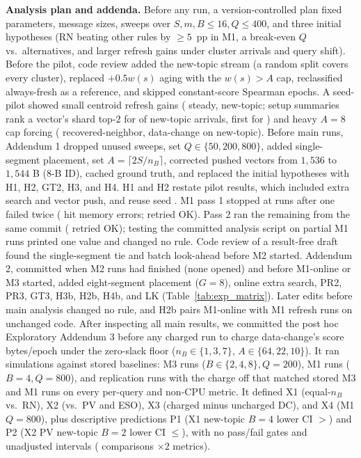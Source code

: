 \textbf{Analysis plan and addenda.} Before any run, a version-controlled plan fixed parameters, message sizes, sweeps over $S, m, B \le 16, Q \le 400$, and three initial hypotheses (RN beating other rules by $\ge 5$~pp in M1, a break-even $Q$ vs.\ alternatives, and larger refresh gains under cluster arrivals and query shift). Before the pilot, code review added the new-topic stream (a random split covers every cluster), replaced $+0.5 w(s)$ aging with the $w(s) > A$ cap, reclassified always-fresh as a reference, and skipped constant-score Spearman epochs. A seed-\RNumPilotSeed{} pilot showed small centroid refresh gains (\RNumPilotGateSteady{} steady, \RNumPilotGateNewTopic{} new-topic; setup summaries rank a vector's shard top-$2$ for \RNumPilotOwnShardTopTwo{} of new-topic arrivals, first for \RNumPilotOwnShardTopOne{}) and heavy $A = 8$ cap forcing (\RNumPilotCapShareRN{} recovered-neighbor, \RNumPilotCapShareDC{} data-change on new-topic). Before main runs, Addendum 1 dropped unused sweeps, set $Q \in \{50, 200, 800\}$, added single-segment placement, set $A = \lceil 2S / n_B \rceil$, corrected pushed vectors from $1{,}536$ to $1{,}544$ B ($8$-B ID), cached ground truth, and replaced the initial hypotheses with H1, H2, GT2, H3, and H4. H1 and H2 restate pilot results, which included extra search and vector push, and reuse seed \RNumPilotSeed{}. M1 pass 1 stopped at \RNumPassOneStoppedAt{} runs after one failed twice (\RNumPassOneFailedRuns{} hit memory errors; \RNumPassOneRetriedOk{} retried OK). Pass 2 ran the remaining \RNumPassTwoRemainingRuns{} from the same commit (\RNumPassTwoRetriedOk{} retried OK); testing the committed analysis script on \RNumPartialMOneTestedRuns{} partial M1 runs printed one value and changed no rule. Code review of a result-free draft found the single-segment tie and batch look-ahead before M2 started. Addendum 2, committed when \RNumAddendumTwoMTwoDone{} M2 runs had finished (none opened) and before M1-online or M3 started, added eight-segment placement ($G = 8$), online extra search, PR2, PR3, GT3, H3b, H2b, H4b, and LK (Table~\ref{tab:exp_matrix}). Later edits before main analysis changed no rule, and H2b pairs M1-online with M1 refresh runs on unchanged code. After inspecting all main results, we committed the post hoc Exploratory Addendum 3 before any charged run to charge data-change's \RNumDCScoreEpochBytes{} score bytes/epoch under the zero-slack floor ($n_B \in \{1, 3, 7\}$, $A \in \{64, 22, 10\}$). It ran \RNumAddThreeTotalRuns{} simulations against stored baselines: \RNumAddThreeMThreeRuns{} M3 runs ($B \in \{2, 4, 8\}, Q{=}200$), \RNumAddThreeMOneRuns{} M1 runs ($B{=}4, Q{=}800$), and \RNumAddThreeRepRuns{} replication runs with the charge off that matched stored M3 and M1 runs on every per-query and non-CPU metric. It defined X1 (equal-$n_B$ vs.\ RN), X2 (vs.\ PV and ESO), X3 (charged minus uncharged DC), and X4 (M1 $Q{=}800$), plus descriptive predictions P1 (X1 new-topic $B{=}4$ lower CI $> {}$\RNumAddThreePOneBound{}) and P2 (X2 PV new-topic $B{=}2$ lower CI $\le {}$\RNumAddThreePTwoBound{}), with no pass/fail gates and \RNumAddThreeTotalIntervals{} unadjusted intervals (\RNumAddThreeCompRows{} comparisons $\times 2$ metrics).

